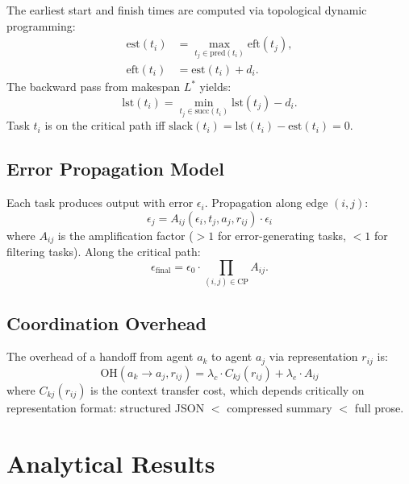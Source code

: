 \documentclass[10pt, twocolumn]{article}
\begin{document}
The earliest start and finish times are computed via topological dynamic programming:
\begin{align}
    \text{est}(t_i) &= \max_{t_j \in \text{pred}(t_i)} \text{eft}(t_j), \\
    \text{eft}(t_i) &= \text{est}(t_i) + d_i.
\end{align}
The backward pass from makespan $L^*$ yields:
\begin{equation}
    \text{lst}(t_i) = \min_{t_j \in \text{succ}(t_i)} \text{lst}(t_j) - d_i.
\end{equation}
Task $t_i$ is on the critical path iff $\text{slack}(t_i) = \text{lst}(t_i) - \text{est}(t_i) = 0$.

\subsection{Error Propagation Model}

Each task produces output with error $\epsilon_i$. Propagation along edge $(i,j)$:
\begin{equation}
\label{eq:error_prop}
    \epsilon_j = A_{ij}(\epsilon_i, t_j, a_j, r_{ij}) \cdot \epsilon_i
\end{equation}
where $A_{ij}$ is the amplification factor ($>1$ for error-generating tasks, $<1$ for filtering tasks). Along the critical path:
\begin{equation}
    \epsilon_{\text{final}} = \epsilon_0 \cdot \prod_{(i,j) \in \text{CP}} A_{ij}.
\end{equation}

\subsection{Coordination Overhead}

The overhead of a handoff from agent $a_k$ to agent $a_j$ via representation $r_{ij}$ is:
\begin{equation}
\label{eq:overhead}
    \text{OH}(a_k \to a_j, r_{ij}) = \lambda_c \cdot C_{kj}(r_{ij}) + \lambda_e \cdot A_{ij}
\end{equation}
where $C_{kj}(r_{ij})$ is the context transfer cost, which depends critically on representation format: structured JSON $<$ compressed summary $<$ full prose.

\section{Analytical Results}
\label{sec:analytical}
\end{document}
